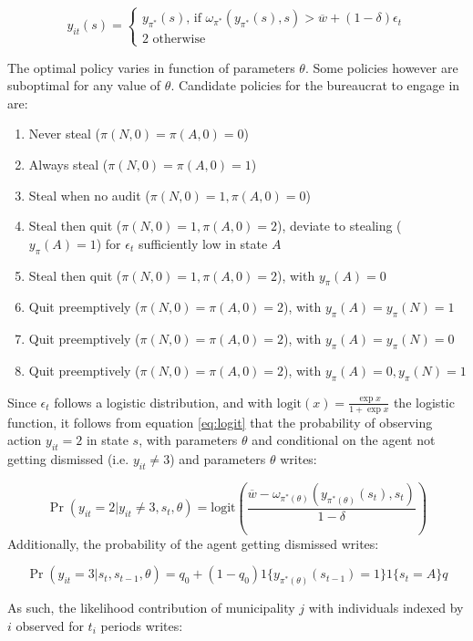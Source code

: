 \documentclass[12pt,a4paper]{article}
\theoremstyle{definition}
\newcommand{\wb}{\overline{w}}
\newcommand{\de}{\delta}
\begin{document}
{\begin{equation}
    \label{eq:logit}
    y_{it}(s) = \begin{cases}
        y_{\pi^*}(s) \text{, if } \omega_{\pi^*}(y_{\pi^*}(s),s) > \wb + (1-\de) \epsilon_t \\ 
        2 \text{ otherwise}
    \end{cases}
\end{equation}

The optimal policy varies in function of parameters $\theta$. Some policies however are suboptimal for any value of $\theta$. Candidate policies for the bureaucrat to engage in are: 

\begin{enumerate}
    \item Never steal ($\pi(N,0)=\pi(A,0)=0$) 
    \item Always steal ($\pi(N,0)=\pi(A,0)=1$) 
    \item Steal when no audit ($\pi(N,0)=1,\pi(A,0)=0$)
    \item Steal then quit ($\pi(N,0)=1,\pi(A,0)=2$), deviate to stealing ($y_\pi(A)=1$) for $\epsilon_t$ sufficiently low in state $A$
    \item Steal then quit ($\pi(N,0)=1,\pi(A,0)=2$), with $y_\pi(A)=0$
    \item Quit preemptively ($\pi(N,0)=\pi(A,0)=2$), with $y_\pi(A)=y_\pi(N)=1$
    \item Quit preemptively ($\pi(N,0)=\pi(A,0)=2$), with $y_\pi(A)=y_\pi(N)=0$
    \item Quit preemptively ($\pi(N,0)=\pi(A,0)=2$), with $y_\pi(A)=0, y_\pi(N)=1$
\end{enumerate}

Since $\epsilon_t$ follows a logistic distribution, and with $\text{logit}(x) = \frac{\exp x}{1 + \exp x}$ the logistic function, it follows from equation \ref{eq:logit} that the probability of observing action $y_{it} = 2$ in state $s$, with parameters $\theta$ and conditional on the agent not getting dismissed (i.e. $y_{it} \neq 3$) and parameters $\theta$ writes:

$$
\Pr(y_{it} = 2 | y_{it} \neq 3, s_t, \theta) = \text{logit} \left( \frac{\wb - \omega_{\pi^*(\theta)}(y_{\pi^*(\theta)}(s_t),s_t)}{1-\de} \right)
$$
Additionally, the probability of the agent getting dismissed writes:

$$
\Pr(y_{it} = 3 | s_t, s_{t-1}, \theta) = q_0 + (1-q_0) 1\{y_{\pi^*(\theta)}(s_{t-1}) = 1\} 1\{s_t = A\} q
$$

As such, the likelihood contribution of municipality $j$ with individuals indexed by $i$ observed for $t_i$ periods writes:

}
\end{document}

